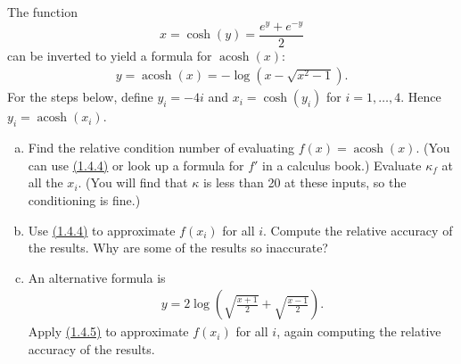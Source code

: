 \documentclass{article}
\DeclareMathOperator{\acosh}{acosh}
\newenvironment{problem}[2][Problem]{\begin{trivlist}
\item[\hskip \labelsep {\bfseries #1}\hskip \labelsep {\bfseries #2.}]}{\end{trivlist}}
\theoremstyle{definition}
\begin{document}
\begin{problem}{1.4.3}
    The function $$x = \cosh(y) = \frac{e^y + e^{-y}}{2}$$ can be inverted to yield a formula for $\acosh(x)$: 
    \begin{align}
        y = \acosh(x) = -\log(x - \sqrt{x^2 - 1}).\tag{1.4.4}
    \end{align}
    For the steps below, define $y_i = -4i$ and $x_i = \cosh(y_i)$ for $i = 1, \ldots, 4$. Hence $y_i = \acosh(x_i)$.

    \begin{enumerate}[(a)]
        \item Find the relative condition number of evaluating $f(x) = \acosh(x)$. (You can use \href{https://fncbook.com/stability/#acosh}{(1.4.4)} or look up a formula for $f'$ in a calculus book.) Evaluate $\kappa_f$ at all the $x_i$. (You will find that $\kappa$ is less than 20 at these inputs, so the conditioning is fine.)
        \item Use \href{https://fncbook.com/stability/#acosh}{(1.4.4)} to approximate $f(x_i)$ for all $i$. Compute the relative accuracy of the results. Why are some of the results so inaccurate?
        \item An alternative formula is
        \begin{align}
            y = 2\log\left(\sqrt{\frac{x+1}{2}} + \sqrt{\frac{x-1}{2}}\right).\tag{1.4.5}
        \end{align}
        Apply \href{https://fncbook.com/stability/#acosh2}{(1.4.5)} to approximate $f(x_i)$ for all $i$, again computing the relative accuracy of the results.
    \end{enumerate}
\end{problem}
\end{document}
